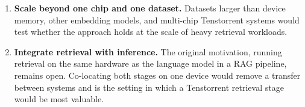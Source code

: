 \begin{enumerate}
    already splits lists longer than 128 pages into chunks. Finer slices, down
    to a few pages, would balance the load further across the workers, so that
    no single large task sets the completion time of a batch. The single
    aggregation core would then remain a bottleneck only at low
    \(N_{\mathrm{probe}}\). A tree-shaped reduction is not expected to be an efficient
    alternative: intermediate reduction nodes would need L1 space that the
    fine search uses for its fetch buffers, and every core would have to act
    both as a worker and as a reduction node.
    \item \textbf{Scale beyond one chip and one dataset.} Datasets larger than
    device memory, other embedding models, and multi-chip Tenstorrent systems
    would test whether the approach holds at the scale of heavy retrieval
    workloads.
    \item \textbf{Integrate retrieval with inference.} The original motivation,
    running retrieval on the same hardware as the language model in a RAG
    pipeline, remains open. Co-locating both stages on one device would remove
    a transfer between systems and is the setting in which a Tenstorrent
    retrieval stage would be most valuable.
\end{enumerate}

\cleardoublepage
